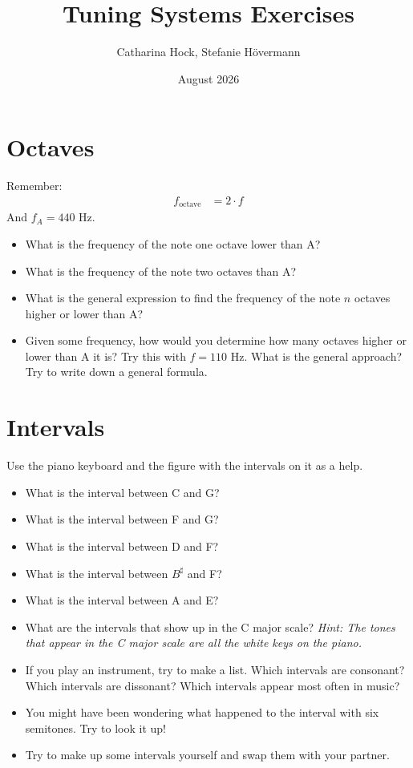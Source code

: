 \documentclass[a4paper, 11pt]{article}
\title{Tuning Systems Exercises}
\author{Catharina Hock, Stefanie Hövermann}
\date{August  2026}
\begin{document}
\maketitle 

\section{Octaves}

Remember:
\begin{align}
    f_{\text{octave}} &= 2 \cdot f
\end{align}
And $f_A = 440$ Hz.
\begin{itemize}
    \item  What is the frequency of the note one octave lower than A?
    \item What is the frequency of the note two octaves than A?
    \item What is the general expression to find the frequency of the note $n$ octaves higher or lower than A?
    \item Given some frequency, how would you determine how many octaves higher or lower than A it is? Try this with $f = 110$ Hz. What is the general approach? Try to write down a general formula.
\end{itemize}

\section{Intervals}
Use the piano keyboard and the figure with the intervals on it as a help.
\begin{itemize}
    \item What is the interval between C and G?
    \item What is the interval between F and G?
    \item What is the interval between D and F?
    \item What is the interval between $B^\sharp$ and F?
    \item What is the interval between A and E?
    \item What are the intervals that show up in the C major scale? \textit{Hint: The tones that appear in the C major scale are all the white keys on the piano.}
    \item If you play an instrument, try to make a list. Which intervals are consonant? Which intervals are dissonant? Which intervals appear most often in music?
    \item You might have been wondering what happened to the interval with six semitones. Try to look it up!
    \item Try to make up some intervals yourself and swap them with your partner.
\end{itemize}
\end{document}
